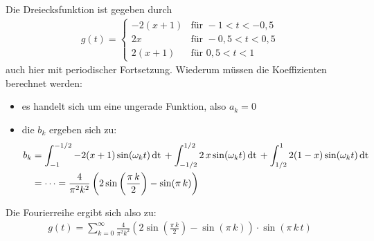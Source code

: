 Die Dreiecksfunktion ist gegeben durch
                \begin{align*}
                   g(t) = \begin{cases}
                    -2(x+1) & \text{für } -1   < t < -0,5 \\
                    2x      & \text{für } -0,5 < t <  0,5 \\
                    2(x+1)  & \text{für } 0,5  < t <  1
                        \end{cases}
                \end{align*}
auch hier mit periodischer Fortsetzung.
Wiederum müssen die Koeffizienten berechnet werden:
                \begin{itemize}
                   \item es handelt sich um eine ungerade Funktion, also $a_k = 0$
                   \item die $b_k$ ergeben sich zu:
                        \begin{align*}
                            b_k &= \int_{-1}^{-1/2} -2(x+1) \sin(\omega_k t) \,\text{dt}\,
                            + \int_{-1/2}^{1/2} 2 \, x \sin(\omega_k t) \,\text{dt}\,
                            + \int_{1/2}^{1} 2(1-x) \sin(\omega_k t) \,\text{dt}\, \\
                            &= \dots = \frac{4}{\pi^2 k^2}  
                             \left(
                                2 \sin \left( \frac{\pi \,k}{2} \right)
                                - \sin(\pi \, k)
                             \right)
                        \end{align*} 
                \end{itemize}
Die Fourierreihe ergibt sich also zu:
                \begin{align*}
                   g(t) = \sum_{k=0}^\infty \frac{4}{\pi^2 k^2} 
                    \left(
                        2 \sin \left( \frac{\pi \, k}{2} \right)
                        - \sin(\pi \, k) 
                    \right) \cdot \sin(\pi \, k \, t) 
                \end{align*}
